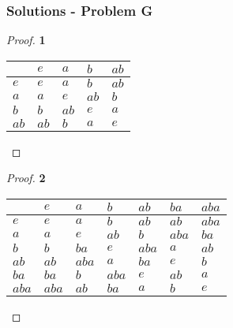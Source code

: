 \documentclass[11pt]{article}
\begin{document}
	\subsubsection*{Solutions - Problem G}
	\begin{proof}{\textbf{1}}\\ 
		\begin{adjustbox}{max width=\textwidth,center}
		\begin{tabular}{l|llll}
			    & $e$ & $a$ & $b$ & $ab$ \\ \hline
			$e$ & $e$ & $a$ & $b$ & $ab$ \\
			$a$ & $a$ & $e$ & $ab$ & $b$ \\
			$b$ & $b$ & $ab$ & $e$ & $a$ \\			
			$ab$ & $ab$ & $b$ & $a$ & $e$ \\
		\end{tabular}
		\end{adjustbox}
	\end{proof}
	\begin{proof}{\textbf{2}}\\ 
		\begin{adjustbox}{max width=\textwidth,center}
		\begin{tabular}{l|llllll}
			    & $e$ & $a$ & $b$ & $ab$ & $ba$ & $aba$ \\ \hline
			$e$ & $e$ & $a$ & $b$ & $ab$ & $ab$ & $aba$ \\
			$a$ & $a$ & $e$ & $ab$ & $b$ & $aba$ & $ba$ \\
			$b$ & $b$ & $ba$ & $e$ & $aba$ & $a$ & $ab$ \\			
			$ab$ & $ab$ & $aba$ & $a$ & $ba$ & $e$ & $b$ \\
			$ba$ & $ba$ & $b$ & $aba$ & $e$ & $ab$ & $a$ \\
			$aba$ & $aba$ & $ab$ & $ba$ & $a$ & $b$ & $e$ \\
		\end{tabular}
		\end{adjustbox}
	\end{proof}
\cleardoublepage
\end{document}
